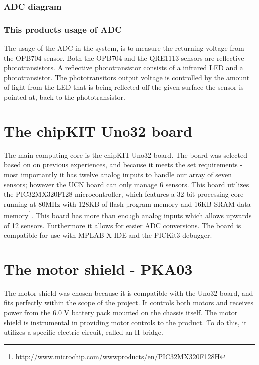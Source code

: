 \subsubsection{ADC diagram} 

\subsubsection{This products usage of ADC}
The usage of the ADC in the system, is to measure the returning voltage from the OPB704 sensor. Both the OPB704 and the QRE1113 sensors are reflective phototransistors.
A reflective phototransistor consists of a infrared LED and a phototransistor.
The phototransitors output voltage is controlled by the amount of light from the LED that is being reflected off the given surface the sensor is pointed at, back to the phototransistor.

\section{The chipKIT Uno32 board}
The main computing core is the chipKIT Uno32 board. The board was selected based on on previous experiences, and because it meets the set requirements - most importantly it has twelve analog imputs to handle our array of seven sensors; however the UCN board can only manage 6 sensors. This board utilizes the PIC32MX320F128 microcontroller, which features a 32-bit processing core running at 80MHz with 128KB of flash program memory and 16KB SRAM data memory\footnote{http://www.microchip.com/wwwproducts/en/PIC32MX320F128H}. 
This board has more than enough analog inputs which allows upwards of 12 sensors. Furthermore it allows for easier ADC conversions.
The board is compatible for use with MPLAB X IDE and the PICKit3 debugger.

\section{The motor shield - PKA03}
The motor shield was chosen because it is compatible with the Uno32 board, and fits perfectly within the scope of the project. It controls both motors and receives power from the 6.0 V battery pack mounted on the chassis itself. The motor shield is instrumental in providing motor controls to the product. To do this, it utilizes a specific electric circuit, called an H bridge.

